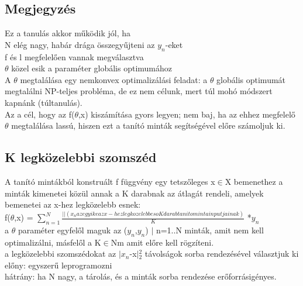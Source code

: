 \documentclass{article}
\begin{document}
	 \subsection{Megjegyzés}
	 Ez a tanulás akkor működik jól, ha\\
	 N elég nagy, habár drága összegyűjteni az $y_n$-eket\\
	 f és l megfelelően vannak megválasztva\\
	 $\theta$ közel esik a paraméter globális optimumához\\
	 A $\theta$ megtalálása egy nemkonvex optimalizálási feladat: a $\theta$ globális optimumát megtalálni NP-teljes probléma, de ez nem célunk, mert túl mohó módszert kapnánk (túltanulás).\\
	 Az a cél, hogy az f($\theta$,x) kiszámítása gyors legyen; nem baj, ha az ehhez megfelelő $\theta$ megtalálása lassú, hiszen ezt a tanító minták segítségével előre számoljuk ki.\\
	 
	 \subsection{K legközelebbi szomszéd}
	 A tanító mintákból konstruált f függvény egy tetszőleges x$\in$X bemenethez a minták kimenetei közül annak a K darabnak az átlagát rendeli, amelyek bemenetei az x-hez legközelebb esnek:\\
	 f($\theta$,x) = $\sum_{n=1}^{N}$$\frac{||(x_n az egyike az x-hez legkozelebb eso K darab tanito minta inputjainak)}{K}$ *$y_n$\\
	 a $\theta$ paraméter egyfelől maguk az {($y_n$,$y_n$) $|$ n=1..N} minták, amit nem kell optimalizálni, másfelől a K$\in$Nm amit előre kell rögzíteni.\\
	 a legközelebbi szomszédokat az $|$$x_n$-x$|$$^2_2$	 távolságok sorba rendezésével választjuk ki\\
	 előny: egyszerű leprogramozni\\
	 hátrány: ha N nagy, a tárolás, és a minták sorba rendezése erőforrásigényes.\\
	 
	 \newpage
\end{document}
